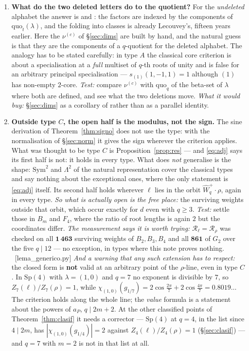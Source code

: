 \documentclass[11pt,a4paper]{article}
\theoremstyle{definition}
\newcommand{\Sp}{\mathrm{Sp}}
\newcommand{\ver}[1]{\unskip\penalty0\ \textcolor{azul}{\small\textsf{[#1]}}}
\begin{document}
\begin{enumerate}
\item \textbf{What do the two deleted letters do to the quotient?}
For the \emph{undeleted} alphabet the answer is \cite{Lec07a} and \cite{AK22}: the factors are
indexed by the components of $\mathrm{quo}_t(\lambda)$, and the folding into classes is already
Lecouvey's, fifteen years earlier. Here the $\nu^{(c)}$ of \S\ref{sec:dims} are built by hand,
and the natural guess is that they are the components of a $q$-quotient for the deleted alphabet.
The analogy has to be stated carefully: in type $A$ the classical core criterion is about a
specialisation at a \emph{full} multiset of $q$-th roots of unity and is false for an arbitrary
principal specialisation --- $s_{(1)}(1,-1,1)=1$ although $(1)$ has non-empty $2$-core.
\emph{Test:} compare $\nu^{(c)}$ with $\mathrm{quo}_q$ of the beta-set of $\lambda$ where both are
defined, and see what the two deletions move. \emph{What it would buy:} \S\ref{sec:dims} as a
corollary of \cite{AK22} rather than as a parallel identity.

\item \textbf{Outside type $C$, the open half is the modulus, not the sign.}
The sine derivation of Theorem~\ref{thm:signo} does not use the type: with the normalisation of
\S\ref{sec:norm} it gives the sign wherever the criterion applies. What was thought to be type $C$
is Proposition~\ref{prop:res} --- and \eqref{eq:adj} says its first half is not: it holds in every
type. What does \emph{not} generalise is the shape: $\mathrm{Sym}^2$ and $\Lambda^2$ of the
natural representation cover the classical types and say nothing about the exceptional ones,
where the only statement is \eqref{eq:adj} itself. Its second half holds
wherever $\ell$ lies in the orbit $\widehat W_q^{+}\!\cdot\rho$, again in every type. \emph{So what
is actually open is the free place:} the surviving weights outside that orbit, which occur exactly
for $d$ even with $q\ge3$. \emph{Test:} settle those in $B_m$ and $F_4$, where the ratio of root
lengths is again $2$ but the coordinates differ. \emph{The measurement says it is worth trying:}
$\mathscr{R}_\ell=\mathscr{R}_\rho$ was checked on all $\mathbf{1\,463}$ surviving weights of
$B_2,B_3,B_4$ and all $\mathbf{861}$ of $G_2$ over the five $q\mid12$ --- no exception, in types
where this note proves nothing. \ver{lema\_generico.py} \emph{And a warning that any such extension has to respect:} the closed form is
\textbf{not} valid at an arbitrary point of the $\rho$-line, even in type $C$. In $\Sp(4)$ with
$\lambda=(1,0)$ and $q=7$ no exponent is divisible by $7$, so $Z_7(\ell)/Z_7(\rho)=1$, while
$\chi_{(1,0)}(g_{1/7})=2\cos\frac{2\pi}{7}+2\cos\frac{4\pi}{7}=0.8019\ldots$ The criterion holds along the whole line; the \emph{value} formula is a statement about the
powers of $a_P$, $q\mid 2m+2$. At the other classified points of Theorem~\ref{thm:clasif} it needs a
corrector --- $\Sp(4)$ at $q=4$, in the list since $4\mid 2m$, has $|\chi_{(1,0)}(g_{1/4})|=2$
against $Z_4(\ell)/Z_4(\rho)=1$ (\S\ref{sec:clasif}) --- and $q=7$ with $m=2$ is not in that
list at all.


\end{enumerate}
\end{document}
